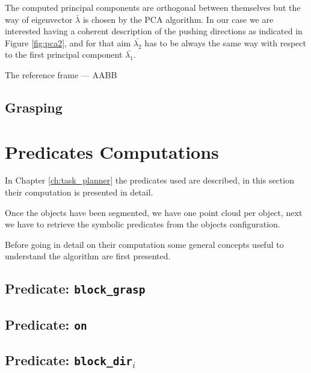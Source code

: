 The computed principal components are orthogonal between themselves but the way of eigenvector $\bar{\lambda}$ is chosen by the PCA algorithm. In our case we are interested having a coherent description of the pushing directions as indicated in Figure \ref{fig:pca2}, and for that aim $\bar{\lambda_2}$ has to be always the same way with respect to the first principal component $\bar{\lambda_1}$. 

The reference frame --- AABB

\subsection{Grasping}

\section{Predicates Computations}
In Chapter \ref{ch:task_planner}  the predicates used are described, in this section their computation is presented in detail. 

Once the objects have been segmented, we have one point cloud per object, next we have to retrieve the symbolic predicates from the objects configuration. 

Before going in detail on their computation some general concepts useful to understand the algorithm are first presented. 

\subsection{Predicate: \texttt{block\_grasp}}
\subsection{Predicate: \texttt{on}}
\subsection{Predicate: \texttt{block\_dir$_i$}}
